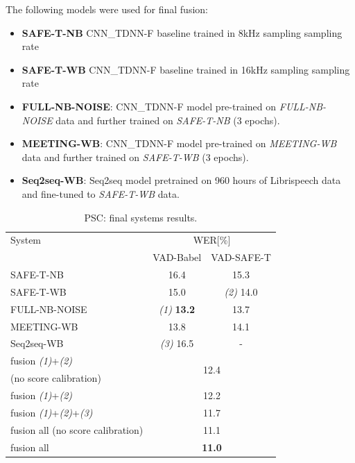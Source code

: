 \documentclass{article}
\begin{document}
The following models were used for final fusion:
\begin{itemize}
    \item {\bf SAFE-T-NB} CNN\_TDNN-F baseline trained in 8kHz sampling sampling rate      
    \item {\bf SAFE-T-WB} CNN\_TDNN-F baseline trained in 16kHz sampling sampling rate      
    \item {\bf FULL-NB-NOISE}: CNN\_TDNN-F model pre-trained on {\it FULL-NB-NOISE} data and
      further trained on {\it SAFE-T-NB} (3 epochs).
    \item {\bf MEETING-WB}: CNN\_TDNN-F model pre-trained on {\it MEETING-WB} data and further
      trained on {\it SAFE-T-WB} (3 epochs).
    \item {\bf Seq2seq-WB}:  Seq2seq model pretrained on 960 hours of Librispeech data and fine-tuned to
    {\it SAFE-T-WB} data.
\end{itemize}
\begin{table}[ht]
\caption{PSC: final systems results.}
\vspace{2mm}
\label{tab:PSCwer}
\begin{center}
\begin{tabular}{lcc}
\hline 
System & \multicolumn{2}{c}{WER[\%]} \\
       & VAD-Babel & VAD-SAFE-T        \\
\hline
 SAFE-T-NB     & 16.4 & 15.3 \\ 
 SAFE-T-WB     & 15.0 & {\em (2)} 14.0 \\
 FULL-NB-NOISE & {\em (1)} {\bf 13.2} & 13.7 \\
 MEETING-WB    & 13.8 & 14.1 \\
Seq2seq-WB            & {\em (3)} 16.5 & -    \\ 
\hline
fusion {\em (1)}+{\em (2)}    & \multicolumn{2}{c}{\multirow{2}{*}{12.4}} \\
(no score calibration) & & \\
fusion {\em (1)}+{\em (2)}             & \multicolumn{2}{c}{12.2} \\
fusion {\em (1)}+{\em (2)}+{\em (3)}   & \multicolumn{2}{c}{11.7} \\ %
fusion all (no score calibration)      & \multicolumn{2}{c}{11.1} \\
fusion all                             & \multicolumn{2}{c}{\bf 11.0} \\
\hline
\end{tabular}
\end{center}
\end{table}
\end{document}
